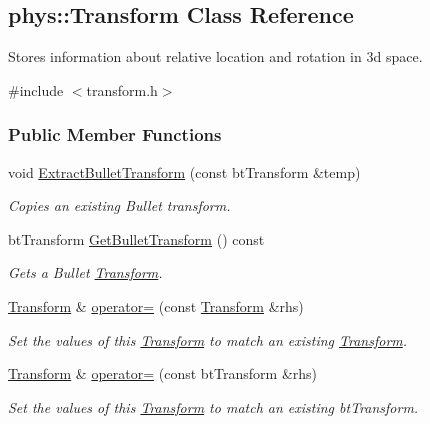 \hypertarget{classphys_1_1Transform}{
\subsection{phys::Transform Class Reference}
\label{classphys_1_1Transform}
}


Stores information about relative location and rotation in 3d space.  




{\ttfamily \#include $<$transform.h$>$}

\subsubsection*{Public Member Functions}
\begin{DoxyCompactItemize}
\item 
void \hyperlink{classphys_1_1Transform_aed7a23ff340f6f7127d888ac78a0e2d2}{ExtractBulletTransform} (const btTransform \&temp)
\begin{DoxyCompactList}\small\item\em Copies an existing Bullet transform. \item\end{DoxyCompactList}\item 
btTransform \hyperlink{classphys_1_1Transform_aeba2f37ed8b4040437adba57417d677a}{GetBulletTransform} () const 
\begin{DoxyCompactList}\small\item\em Gets a Bullet \hyperlink{classphys_1_1Transform}{Transform}. \item\end{DoxyCompactList}\item 
\hyperlink{classphys_1_1Transform}{Transform} \& \hyperlink{classphys_1_1Transform_af0ce2efdabe87f3c9b16fa9b743d8a4e}{operator=} (const \hyperlink{classphys_1_1Transform}{Transform} \&rhs)
\begin{DoxyCompactList}\small\item\em Set the values of this \hyperlink{classphys_1_1Transform}{Transform} to match an existing \hyperlink{classphys_1_1Transform}{Transform}. \item\end{DoxyCompactList}\item 
\hyperlink{classphys_1_1Transform}{Transform} \& \hyperlink{classphys_1_1Transform_a23e04d8fdccd20a6057d84311d8a925e}{operator=} (const btTransform \&rhs)
\begin{DoxyCompactList}\small\item\em Set the values of this \hyperlink{classphys_1_1Transform}{Transform} to match an existing btTransform. \item\end{DoxyCompactList}\item 

\end{DoxyCompactItemize}
